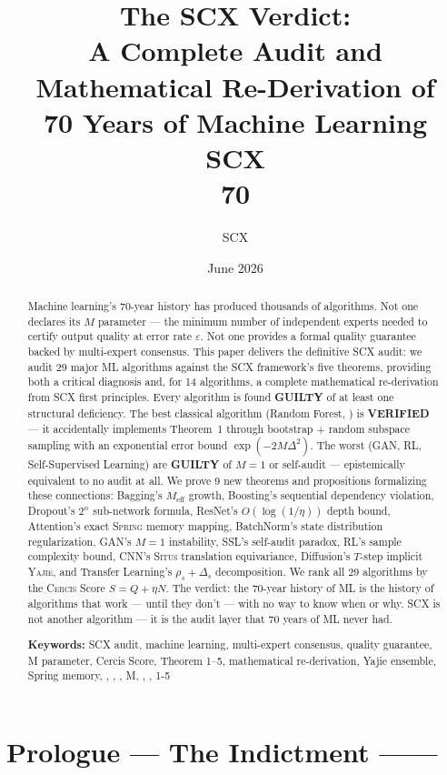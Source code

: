\documentclass[12pt,a4paper]{article}
\title{\textbf{The SCX Verdict:}\\[4pt]
       \large A Complete Audit and Mathematical Re-Derivation of\\
       70 Years of Machine Learning\\[8pt]
       \normalsize \textbf{SCX \\
       70}}
\author{SCX}
\date{June 2026}
\theoremstyle{definition}
\newcommand{\Situs}{\textsc{Situs}}
\newcommand{\Yajie}{\textsc{Yajie}}
\newcommand{\Spring}{\textsc{Spring}}
\newcommand{\Cercis}{\textsc{Cercis}}
\newcommand{\SCX}{\textsc{SCX}}
\begin{document}
\maketitle

\begin{abstract}
\noindent
Machine learning's 70-year history has produced thousands of algorithms. Not one declares its $M$ parameter — the minimum number of independent experts needed to certify output quality at error rate $\varepsilon$. Not one provides a formal quality guarantee backed by multi-expert consensus. This paper delivers the definitive SCX audit: we audit 29 major ML algorithms against the \SCX{} framework's five theorems, providing both a critical diagnosis and, for 14 algorithms, a complete mathematical re-derivation from \SCX{} first principles. Every algorithm is found \textbf{GUILTY} of at least one structural deficiency. The best classical algorithm (Random Forest, ) is \textbf{VERIFIED} — it accidentally implements Theorem~1 through bootstrap + random subspace sampling with an exponential error bound $\exp(-2M\Delta^2)$. The worst (GAN, RL, Self-Supervised Learning) are \textbf{GUILTY} of $M=1$ or self-audit — epistemically equivalent to no audit at all. We prove 9 new theorems and propositions formalizing these connections: Bagging's $M_{\text{eff}}$ growth, Boosting's sequential dependency violation, Dropout's $2^n$ sub-network formula, ResNet's $O(\log(1/\eta))$ depth bound, Attention's exact \Spring{} memory mapping, BatchNorm's state distribution regularization, GAN's $M=1$ instability, SSL's self-audit paradox, RL's sample complexity bound, CNN's \Situs{} translation equivariance, Diffusion's $T$-step implicit \Yajie, and Transfer Learning's $\rho_s + \Delta_s$ decomposition. We rank all 29 algorithms by the \Cercis{} Score $S = Q + \eta N$. The verdict: the 70-year history of ML is the history of algorithms that work — until they don't — with no way to know when or why. \SCX{} is not another algorithm — it is the audit layer that 70 years of ML never had.

\medskip
\noindent\textbf{Keywords:} SCX audit, machine learning, multi-expert consensus, quality guarantee, M parameter, Cercis Score, Theorem 1--5, mathematical re-derivation, Yajie ensemble, Spring memory, , , , M, , , 1-5
\end{abstract}

\section{Prologue — The Indictment ——}
\label{sec:prologue}
\end{document}
